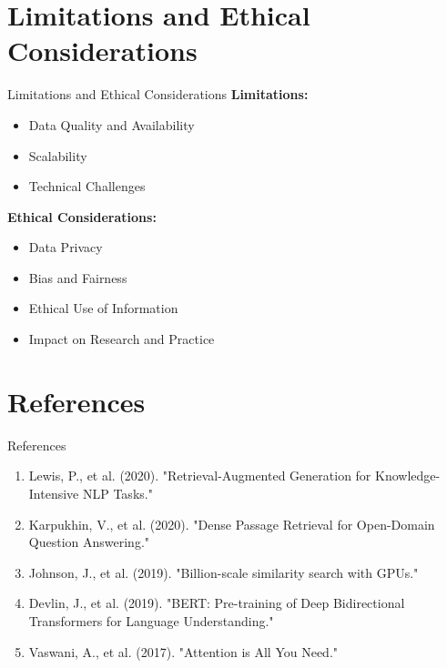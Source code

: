 \documentclass{beamer}
\begin{document}
\section{Limitations and Ethical Considerations}
\begin{frame}{Limitations and Ethical Considerations}
  \textbf{Limitations:}
  \begin{itemize}
    \item Data Quality and Availability
    \item Scalability
    \item Technical Challenges
  \end{itemize}
  \textbf{Ethical Considerations:}
  \begin{itemize}
    \item Data Privacy
    \item Bias and Fairness
    \item Ethical Use of Information
    \item Impact on Research and Practice
  \end{itemize}
\end{frame}

\section{References}
\begin{frame}{References}
  \begin{enumerate}
    \item Lewis, P., et al. (2020). "Retrieval-Augmented Generation for Knowledge-Intensive NLP Tasks."
    \item Karpukhin, V., et al. (2020). "Dense Passage Retrieval for Open-Domain Question Answering."
    \item Johnson, J., et al. (2019). "Billion-scale similarity search with GPUs."
    \item Devlin, J., et al. (2019). "BERT: Pre-training of Deep Bidirectional Transformers for Language Understanding."
    \item Vaswani, A., et al. (2017). "Attention is All You Need."
  \end{enumerate}
\end{frame}
\end{document}
